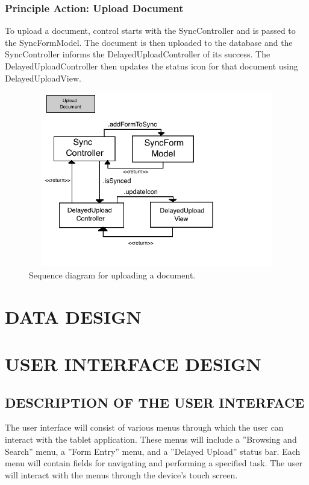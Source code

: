 \documentclass[twoside,letterpaper]{article}
\begin{document}
{\subsubsection{Principle Action: Upload Document}
To upload a document, control starts with the SyncController and is passed to the SyncFormModel. The document is then uploaded to the database and the SyncController informs the DelayedUploadController of its success. The DelayedUploadController then updates the status icon for that document using DelayedUploadView.
\begin{figure}[H]
\centering
\includegraphics[width=5in,height=3in]{Upload.jpg}
\caption{Sequence diagram for uploading a document.}
\end{figure}


\clearpage\section[DATA DESIGN]{\rmfamily\bfseries\color{black}
DATA DESIGN}

\clearpage\section[USER INTERFACE DESIGN]{\rmfamily\bfseries\color{black}
USER INTERFACE DESIGN}

\subsection[DESCRIPTION OF THE USER INTERFACE]{\rmfamily\bfseries\color{black}
DESCRIPTION OF THE USER INTERFACE}
{\rmfamily\color{black}
The user interface will consist of various menus through which the user can interact with the tablet application. These menus will include a ''Browsing and Search'' menu, a ''Form Entry'' menu, and a ''Delayed Upload'' status bar. Each menu will contain fields for navigating and performing a specified task. The user will interact with the menus through the device's touch screen. 
\newline

}}
\end{document}
